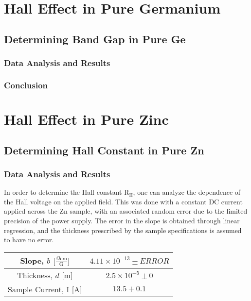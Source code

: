 \documentclass[a4paper]{article}
\begin{document}
\newpage

\section{Hall Effect in Pure Germanium}

\subsection{Determining Band Gap in Pure Ge}

\subsubsection{Data Analysis and Results}

\subsubsection{Conclusion}

\section{Hall Effect in Pure Zinc}

\subsection{Determining Hall Constant in Pure Zn}

\subsubsection{Data Analysis and Results}
\qq In order to determine the Hall constant $\text{R}_\text{H}$, one can
analyze the dependence of the Hall voltage on the applied field. This
was done with a constant DC current applied across the Zn sample, with
an associated random error due to the limited precision of the power
supply. The error in the slope is obtained through linear regression,
and the thickness prescribed by the sample specifications is assumed
to have no error.

\begin{center}
\begin{tabular}{|c|c|}
\hline
Slope, $b$ $\big[  \frac{\Omega \text{cm}}{\text{G}} \big] $ & $4.11 \times 10^{-13} \pm ERROR$ \topVspace \bottomVspace \\
\hline
Thickness, $d$ [m] & $2.5 \times 10^{-5} \pm 0$ \topVspace \bottomVspace \\
\hline
Sample Current, I [A] & $13.5 \pm 0.1$ \topVspace \bottomVspace \\
\hline
\end{tabular}
\label{table:zinc_RH}
\end{center}
\end{document}
